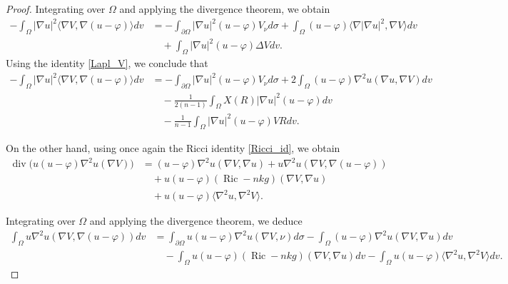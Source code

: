 \documentclass[10pt,a4paper]{amsart}
\begin{document}
\begin{proof}
Integrating over \(\Omega\) and applying the divergence theorem, we obtain
\begin{align}\label{eqaux0}
-\int_{\Omega}|\nabla u|^{2}\langle\nabla V,\nabla(u-\varphi)\rangle dv
&=
-\int_{\partial\Omega}|\nabla u|^{2}(u-\varphi)V_{\nu} d\sigma
+
\int_{\Omega}(u-\varphi)\langle\nabla |\nabla u|^{2},\nabla V\rangle dv
\nonumber\\
&\quad
+
\int_{\Omega}|\nabla u|^{2}(u-\varphi)\Delta V dv.
\end{align}
Using the identity \eqref{Lapl_V}, we conclude that
\begin{align}\label{eqaux0_final}
-\int_{\Omega}|\nabla u|^{2}\langle\nabla V,\nabla(u-\varphi)\rangle dv
&=
-\int_{\partial\Omega}|\nabla u|^{2}(u-\varphi)V_{\nu} d\sigma
+
2\int_{\Omega}(u-\varphi)\nabla^2 u(\nabla u,\nabla V) dv
\nonumber\\
&\quad
-
\frac{1}{2(n-1)}
\int_{\Omega}X(R)|\nabla u|^{2}(u-\varphi)dv
\nonumber\\
&\quad
-
\frac{1}{n-1}
\int_{\Omega}|\nabla u|^{2}(u-\varphi)VR dv.
\end{align}

On the other hand, using once again the Ricci identity \eqref{Ricci_id}, we obtain
\begin{align*}
\operatorname{div}\bigl(u(u-\varphi)\nabla^{2}u(\nabla V)\bigr)
&=
(u-\varphi)\nabla^{2}u(\nabla V,\nabla u)
+
u\nabla^{2}u(\nabla V,\nabla(u-\varphi))
\nonumber\\
&\quad
+
u(u-\varphi)(\operatorname{Ric}-nkg)(\nabla V,\nabla u)
\nonumber\\
&\quad
+
u(u-\varphi)\langle\nabla^{2}u,\nabla^{2}V\rangle.
\end{align*}

Integrating over \(\Omega\) and applying the divergence theorem, we deduce
\begin{align}\label{auxeq1}
\int_{\Omega}u\nabla^{2}u(\nabla V,\nabla(u-\varphi)) dv
&=
\int_{\partial\Omega}u(u-\varphi)\nabla^{2}u(\nabla V,\nu)d\sigma
-
\int_{\Omega}(u-\varphi)\nabla^{2}u(\nabla V,\nabla u)dv
\nonumber\\
&\quad
-
\int_{\Omega}u(u-\varphi)(\operatorname{Ric}-nkg)(\nabla V,\nabla u)dv
-
\int_{\Omega}u(u-\varphi)\langle\nabla^{2}u,\nabla^{2}V\rangle dv.
\end{align}


\end{proof}
\end{document}

